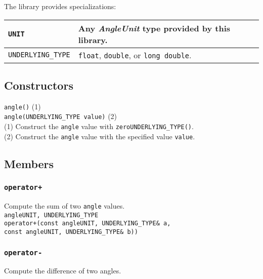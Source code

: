 \documentclass[oneside]{report}
\begin{document}
\noindent{}The library provides specializations:
\begin{center}
\begin{tabularx}{\textwidth}{|X|X|}
\hline
\texttt{UNIT}             & Any \textit{AngleUnit} type provided by this library.\\\hline
\texttt{UNDERLYING\_TYPE} & \texttt{float}, \texttt{double}, or \texttt{long double}.\\\hline
\end{tabularx}
\end{center}

\subsection{Constructors}

\noindent{}\texttt{angle}\texttt{(}\texttt{)} (1)\\
\noindent{}\texttt{angle}\texttt{(}\texttt{UNDERLYING\_TYPE value}\texttt{)} (2)\\

\noindent{}(1) Construct the \texttt{angle} value with \texttt{zero\textlangle UNDERLYING\_TYPE\textrangle()}.\\
(2) Construct the \texttt{angle} value with the specified value \texttt{value}.\\

\subsection{Members}
\subsubsection{\texttt{operator+}}
Compute the sum of two \texttt{angle} values.\\

\noindent\texttt{angle\textlangle UNIT, UNDERLYING\_TYPE\textrangle}\\
\texttt{operator+}\texttt{(}\texttt{const angle\textlangle UNIT, UNDERLYING\_TYPE\textrangle\& a}\texttt{,}\\
\texttt{const angle\textlangle UNIT, UNDERLYING\_TYPE\textrangle\& b)}\texttt{)}\\

\subsubsection{\texttt{operator-}}
Compute the difference of two angles.\\
\end{document}
